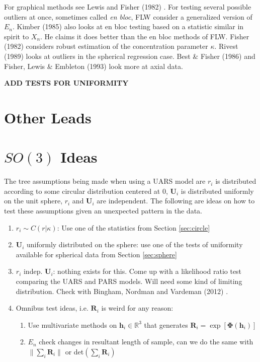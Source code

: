 \documentclass{article}\usepackage[]{graphicx}\usepackage[]{color}
\newcommand{\R}{{\mathbb{R}}}
\begin{document}
For graphical methods see Lewis and Fisher (1982) \cite{lewis1982}.  For testing several possible outliers at once, sometimes called {\it en bloc}, FLW \cite{fisher1981} consider a generalized version of $E_n$.  Kimber (1985) \cite{kimber1985} also looks at en bloc testing based on a statistic similar in spirit to $X_n$.  He claims it does better than the en bloc methods of FLW.  Fisher (1982) \cite{fisher1982} considers robust estimation of the concentration parameter $\kappa$.  Rivest (1989) \cite{rivest1989} looks at outliers in the spherical regression case.  Best \& Fisher (1986) \cite{best1986} and Fisher, Lewis \& Embleton (1993) \cite{fisher1987} look more at axial data.

{\bf ADD TESTS FOR UNIFORMITY}

\section{Other Leads}

\section{$SO(3)$ Ideas}

The tree assumptions being made when using a UARS model are $r_i$ is distributed according to some circular distribution centered at $0$, $\bm U_i$ is distributed uniformly on the unit sphere, $r_i$ and $\bm U_i$ are independent.  The following are ideas on how to test these assumptions given an unexpected pattern in the data.
\begin{enumerate}
\item $r_i\sim C(r|\kappa)$: Use one of the statistics from Section \ref{sec:circle}
\item $\bm U_i$ uniformly distributed on the sphere:  use one of the tests of uniformity available for spherical data from Section \ref{sec:sphere}
\item $r_i$ indep. $\bm U_i$: nothing exists for this.  Come up with a likelihood ratio test comparing the UARS and PARS models.  Will need some kind of limiting distribution.  Check with Bingham, Nordman and Vardeman (2012) \cite{bingham2012}.
\item Omnibus test ideas, i.e. $\bm R_i$ is weird for any reason:
\begin{enumerate}
\item Use multivariate methods on $\bm h_i\in\R^3$ that generates $\bm R_i=\exp[\bm{\Phi}(\bm h_i)]$
\item $E_n$ check changes in resultant length of sample, can we do the same with $\|\sum_i\bm R_i\|$ or det$(\sum_i \bm R_i)$
\end{enumerate}
\end{enumerate}



\end{document}
